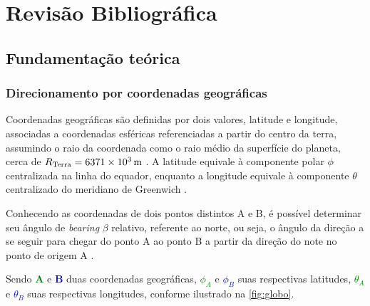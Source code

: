 \chapter{Revisão Bibliográfica}

\section{Fundamentação teórica}

\subsection{Direcionamento por coordenadas geográficas}

Coordenadas geográficas são definidas por dois valores, latitude e longitude, associadas a coordenadas esféricas referenciadas a partir do centro da terra, assumindo o raio da coordenada como o raio médio da superfície do planeta, cerca de $R_\text{Terra} = \SI{6371E3}{\metre}$ \cite{palomaguitarrara, chrisveness}.
A latitude equivale à componente polar $\phi$ centralizada na linha do equador, enquanto a longitude equivale à componente $\theta$ centralizado do meridiano de Greenwich \cite{palomaguitarrara, henriquefleming2003}.

Conhecendo as coordenadas de dois pontos distintos A e B, é possível determinar seu ângulo de \textit{bearing} $\beta$ relativo, referente ao norte, ou seja, o ângulo da direção a se seguir para chegar do ponto A ao ponto B a partir da direção do note no ponto de origem A \cite{henriquefleming2003}.

Sendo \textcolor{Green}{$\mathbf{A}$} e \textcolor{Blue}{$\mathbf{B}$} duas coordenadas geográficas, \textcolor{Green}{$\phi_A$} e \textcolor{Blue}{$\phi_B$} suas respectivas latitudes,  \textcolor{Green}{$\theta_A$} e \textcolor{Blue}{$\theta_B$} suas respectivas longitudes, conforme ilustrado na \autoref{fig:globo}.

